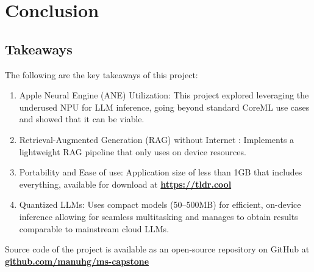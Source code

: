
\chapter{Conclusion}
\label{ch:Conclusion}

\section{Takeaways}
\label{sec:Takeaways}
The following are the key takeaways of this project:
\begin{enumerate}[label=\alph*.]
\item Apple Neural Engine (ANE) Utilization: This project explored leveraging the underused NPU for LLM inference, going beyond standard CoreML use cases and showed that it can be viable.

\item Retrieval-Augmented Generation (RAG) without Internet : Implements a lightweight RAG pipeline that only uses on device resources.

\item Portability and Ease of use: Application size of less than 1GB that includes everything, available for download at \href{https://tldr.cool}{\textbf{https://tldr.cool}}

\item Quantized LLMs: Uses compact models (50–500MB) for efficient, on-device inference allowing for seamless multitasking and manages to obtain results comparable to mainstream cloud LLMs.
\end{enumerate}
Source code of the project is available as an open-source repository on GitHub at \\ \href{https://github.com/manuhg/ms-capstone}{\textbf{github.com/manuhg/ms-capstone}}

